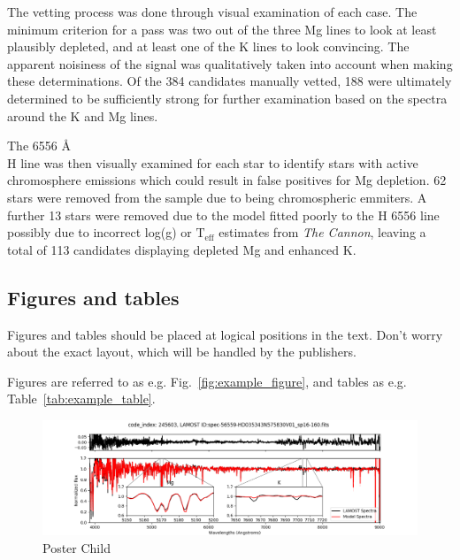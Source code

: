 \documentclass[a4paper,fleqn,usenatbib]{mnras}
\begin{document}
The vetting process was done through visual examination of each case. The minimum criterion for a pass was two out of the three Mg lines to look at least plausibly depleted, and at least one of the K lines to look convincing. The apparent noisiness of the signal was qualitatively taken into account when making these determinations. Of the 384 candidates manually vetted, 188 were ultimately determined to be sufficiently strong for further examination based on the spectra around the K and Mg lines.

The 6556 \AA \\ H line was then visually examined for each star to identify stars with active chromosphere emissions which could result in false positives for Mg depletion. 62 stars were removed from the sample due to being chromospheric emmiters. A further 13 stars were removed due to the model fitted poorly to the H 6556 line possibly due to incorrect log(g) or $\text{T}_{\text{eff}}$ estimates from \textit{The Cannon}, leaving a total of 113 candidates displaying depleted Mg and enhanced K.

\subsection{Figures and tables}

Figures and tables should be placed at logical positions in the text. Don't
worry about the exact layout, which will be handled by the publishers.

Figures are referred to as e.g. Fig.~\ref{fig:example_figure}, and tables as
e.g. Table~\ref{tab:example_table}.




\begin{figure}
	\includegraphics[width=\columnwidth]{posterchildof13.png}
    \caption{Poster Child}
    \label{mhist}
\end{figure}
\end{document}
